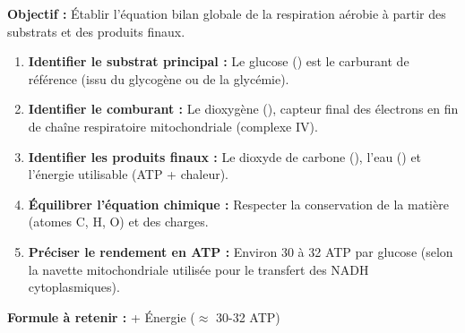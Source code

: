\documentclass[11pt]{article}
\begin{document}
\begin{methode}
    \textbf{Objectif :} Établir l'équation bilan globale de la respiration aérobie à partir des substrats et des produits finaux.
    \begin{enumerate}
        \item \textbf{Identifier le substrat principal :} Le glucose () est le carburant de référence (issu du glycogène ou de la glycémie).
        \item \textbf{Identifier le comburant :} Le dioxygène (), capteur final des électrons en fin de chaîne respiratoire mitochondriale (complexe IV).
        \item \textbf{Identifier les produits finaux :} Le dioxyde de carbone (), l'eau () et l'énergie utilisable (ATP + chaleur).
        \item \textbf{Équilibrer l'équation chimique :} Respecter la conservation de la matière (atomes C, H, O) et des charges.
        \item \textbf{Préciser le rendement en ATP :} Environ \num{30} à \num{32} ATP par glucose (selon la navette mitochondriale utilisée pour le transfert des NADH cytoplasmiques).
    \end{enumerate}
    \textbf{Formule à retenir :}  + Énergie ($\approx$ 30-32 ATP)
\end{methode}
\end{document}
